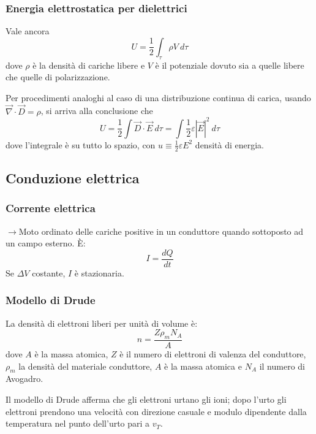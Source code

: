 \documentclass[10pt, a4paper]{scrartcl}
\numberwithin{equation}{subsection}
\theoremstyle{style1}
\begin{document}
\subsubsection{Energia elettrostatica per dielettrici}
Vale ancora 
\begin{equation}
	U = \frac{1}{2}\int_{\tau }  \rho  V \ d\tau 
\end{equation}
dove $\rho $ \`e la densit\`a di cariche libere e $V$ \`e il potenziale dovuto sia a quelle libere che quelle di polarizzazione.

Per procedimenti analoghi al caso di una distribuzione continua di carica, usando $\vec{\nabla }\cdot \vec{D} = \rho $, si arriva alla conclusione che
\begin{equation}
	U = \frac{1}{2}\int \vec{D} \cdot  \vec{E} \ d\tau = \int \frac{1}{2}\varepsilon  |\vec{E} |^2 \ d\tau 
\end{equation}
dove l'integrale \`e su tutto lo spazio, con $u\equiv \frac{1}{2}\varepsilon  E^2$ densit\`a di energia.


\subsection{Conduzione elettrica}
\subsubsection{Corrente elettrica}
$\to$Moto ordinato delle cariche positive in un conduttore quando sottoposto ad un campo esterno. \`E:
\begin{equation}
	I = \frac{dQ}{dt}
\end{equation}
Se $\Delta V$ costante, $I$ \`e stazionaria.
\subsubsection{Modello di Drude}

La densit\`a di elettroni liberi per unit\`a di volume \`e:
\begin{equation}
	n = \frac{Z \rho _m N_A}{A}
\end{equation}
dove $A$ \`e la massa atomica, $Z$ \`e il numero di elettroni di valenza del conduttore, $\rho _m$ la densit\`a del materiale conduttore, $A$ \`e la massa atomica e $N_A$ il numero di Avogadro.

Il modello di Drude afferma che gli elettroni urtano gli ioni; dopo l'urto gli elettroni prendono una velocit\`a con direzione casuale e modulo dipendente dalla temperatura nel punto dell'urto pari a $v_T$.
\end{document}
